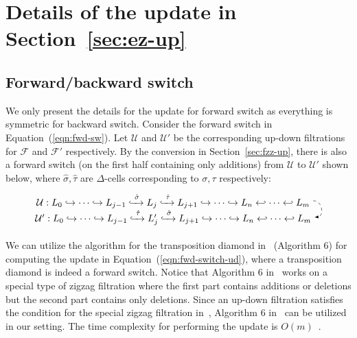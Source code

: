 \documentclass[letterpaper,11pt]{article}
\theoremstyle{mythmstyle}
\theoremstyle{mydefstyle}
\theoremstyle{plain}
\theoremstyle{definition}
\newcommand{\<}[1]{\langle #1\rangle}
\newcommand{\lbarrowspace}{\;}
\newcommand{\incto}{\hookrightarrow}
\newcommand{\inctosp}[1]{\xhookrightarrow{\lbarrowspace#1\lbarrowspace}}
\newcommand{\bakincto}{\hookleftarrow}
\newcommand{\Fcal}{\mathcal{F}}
\newcommand{\DG}{\Delta}
\newcommand{\sG}{\sigma}
\newcommand{\tG}{\tau}
\newcommand{\filtcnt}{m}
\newcommand{\simpcnt}{n}
\newcommand{\Ud}{{\mathcal U}}
\begin{document}



\appendix



\section{Details of the update in Section~\ref{sec:ez-up}}
\label{sec:ez-up-details}


\subsection{Forward/backward switch}
We only present the details for the update for forward switch
as  everything is symmetric for backward switch.
Consider the forward switch in Equation~(\ref{eqn:fwd-sw}).
Let $\Ud$ and $\Ud'$ be the corresponding up-down filtrations for $\Fcal$ and $\Fcal'$ respectively.
By the conversion in Section~\ref{sec:fzz-up},
there is also a forward switch 
(on the first half containing only additions)
from $\Ud$ to $\Ud'$
shown below,
where $\hat{\sG},\hat{\tG}$ are $\DG$-cells corresponding to $\sG,\tG$ respectively:
\begin{equation}\label{eqn:fwd-switch-ud}
\begin{tikzpicture}[baseline=(current  bounding  box.center)]
\tikzstyle{every node}=[minimum width=24em]
\node (a) at (0,0) {$\Ud:L_0\incto\cdots\incto
L_{j-1}\inctosp{\hat{\sG}}
L_{j}\inctosp{\hat{\tG}}
L_{j+1}
\incto
\cdots
\incto
L_{\simpcnt}
\bakincto
\cdots
\bakincto L_{\filtcnt}$}; 
\node (b) at (0,-0.6){$\Ud':L_0\incto\cdots\incto
L_{j-1}\inctosp{\hat{\tG}}
L'_{j}\inctosp{\hat{\sG}}
L_{j+1}
\incto
\cdots
\incto
L_{\simpcnt}
\bakincto
\cdots
\bakincto L_{\filtcnt}$};
\path[->] (a.0) edge [bend left=90,looseness=1.5,arrows={-latex},dashed] (b.0);
\end{tikzpicture}
\end{equation}

We can utilize the algorithm for the transposition diamond
in~\cite{maria2014zigzag} (Algorithm 6) for computing the 
update in Equation~(\ref{eqn:fwd-switch-ud}),
where a transposition diamond 
is indeed a forward switch.
Notice that Algorithm 6 in~\cite{maria2014zigzag} works on
a special type of zigzag filtration where the first part contains
additions or deletions
but the second part contains only deletions.
Since an up-down filtration satisfies the condition for
the special zigzag filtration in~\cite{maria2014zigzag},
Algorithm 6 in~\cite{maria2014zigzag} can be utilized in our setting.
The time complexity for performing the update is $O(\filtcnt)$~\cite{maria2014zigzag}.
\end{document}
